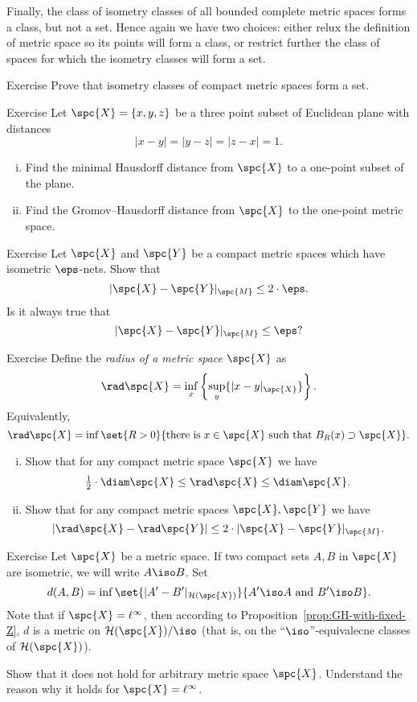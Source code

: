 Finally, the class of isometry classes of all bounded complete metric spaces forms a class, but not a set.
Hence again we have two choices: either relux the definition of metric space so its points will form a class, or restrict further the class of spaces for which the isometry classes will form a set.

\begin{thm}{Exercise}
Prove that isometry classes of compact metric spaces form a set. 
\end{thm}

\begin{thm}{Exercise}\label{pr:GH1}
Let $\spc{X}=\{x,y,z\}$ be a three point subset of Euclidean plane with distances
$$|x-y|=|y-z|=|z-x|=1.$$
\begin{enumerate}[(i)]
\item Find the minimal Hausdorff distance from $\spc{X}$ to a one-point subset of the plane.
\item Find the Gromov--Hausdorff distance from $\spc{X}$ to the one-point metric space. 
\end{enumerate}
\end{thm}

\begin{thm}{Exercise}\label{pr:GH2}
Let $\spc{X}$ and $\spc{Y}$ be a compact metric spaces which have isometric $\eps$-nets.
Show that 
$$|\spc{X}-\spc{Y}|_{\spc{M}}\le 2\cdot\eps.$$
Is it always true that 
$$|\spc{X}-\spc{Y}|_{\spc{M}}\le \eps?$$
\end{thm}




\begin{thm}{Exercise}\label{pr:GH3}
Define the \emph{radius of a metric space} $\spc{X}$ as 
$$\rad \spc{X}=\inf_x\left\{\sup_y\{|x-y|_{\spc{X}}\}\right\}.$$
Equivalently, 
$$\rad \spc{X}=\inf\set{R>0}{\text{there is}\ x\in \spc{X}\  \text{such that}\ B_R(x)\supset \spc{X}}.$$
 
\begin{enumerate}[(i)]
\item Show that for any compact metric space $\spc{X}$ we have
$$\tfrac12\cdot\diam \spc{X}\le \rad \spc{X}\le \diam \spc{X}.$$
\item Show that for any compact metric spaces $\spc{X},\spc{Y}$ we have
$$|\rad \spc{X}-\rad \spc{Y}|\le 2\cdot |\spc{X}-\spc{Y}|_{\spc{M}}.$$
\end{enumerate}
\end{thm}

\begin{thm}{Exercise}\label{pr:F-X}
Let $\spc{X}$ be a metric space.
If two compact sets $A, B$ in $\spc{X}$ are isometric,
we will write $A\iso B$. 
Set
$$d(A,B)=\inf \set{|A'-B'|_{\mathcal{H}(\spc{X})}}{A'\iso A \ \text{and}\ B'\iso B}.$$
Note that if $\spc{X}=\ell^\infty$, then according to Proposition~\ref{prop:GH-with-fixed-Z}, 
$d$ is a metric on $\mathcal{H}(\spc{X})/\iso$ (that is, on the ``$\iso$''-equivalecne classes of $\mathcal{H}(\spc{X})$).

Show that it does not hold for arbitrary metric space $\spc{X}$.
Understand the reason why it holds for $\spc{X}=\ell^\infty$.
\end{thm}


